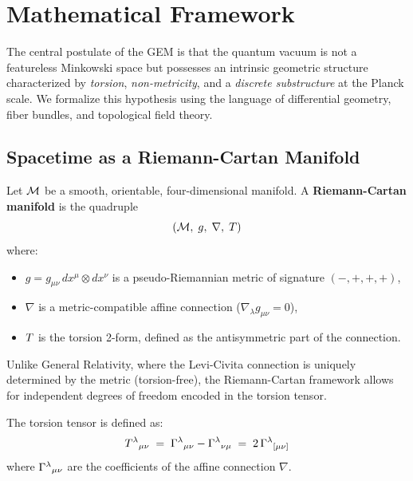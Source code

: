 \section{Mathematical Framework}
\label{sec:framework}

The central postulate of the GEM is that the quantum vacuum is not a featureless Minkowski space but possesses an intrinsic geometric structure characterized by \textit{torsion}, \textit{non-metricity}, and a \textit{discrete substructure} at the Planck scale. We formalize this hypothesis using the language of differential geometry, fiber bundles, and topological field theory.
\subsection{Spacetime as a Riemann-Cartan Manifold}
\begin{definition}
Let $\mathcal{M}$ be a smooth, orientable, four-dimensional manifold. A \textbf{Riemann-Cartan manifold} is the quadruple
\begin{equation}
    (\mathcal{M},\; g,\; \nabla,\; T)
\end{equation}
where:
\begin{itemize}
    \item $g = g_{\mu\nu}\, dx^\mu \otimes dx^\nu$ is a pseudo-Riemannian metric of signature $(-,+,+,+)$,
    \item $\nabla$ is a metric-compatible affine connection ($\nabla_\lambda g_{\mu\nu} = 0$),
    \item $T$ is the torsion 2-form, defined as the antisymmetric part of the connection.
\end{itemize}
\end{definition}

Unlike General Relativity, where the Levi-Civita connection is uniquely determined by the metric (torsion-free), the Riemann-Cartan framework allows for independent degrees of freedom encoded in the torsion tensor.

\begin{definition}
The torsion tensor is defined as:
\begin{equation}
    T^\lambda{}_{\mu\nu} \;=\; \Gamma^\lambda{}_{\mu\nu} - \Gamma^\lambda{}_{\nu\mu} \;=\; 2\,\Gamma^\lambda{}_{[\mu\nu]}
\end{equation}
where $\Gamma^\lambda{}_{\mu\nu}$ are the coefficients of the affine connection $\nabla$.
\end{definition}

